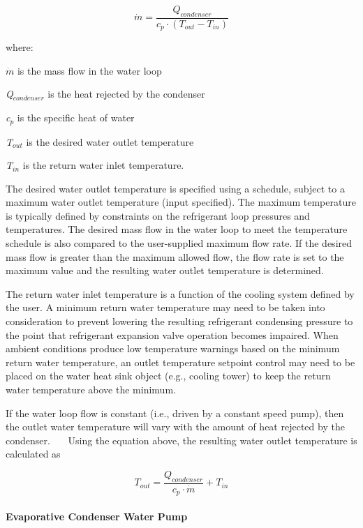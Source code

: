 \begin{equation}
\dot{m} = \frac{{{Q_{condenser}}}}{{{c_p} \cdot ({T_{out}} - {T_{in}})}}
\end{equation}

where:

\emph{\(\dot{m}\)} is the mass flow in the water loop

\emph{Q\(_{condenser}\)} is the heat rejected by the condenser

\emph{c\(_{p}\)} is the specific heat of water

\emph{T\(_{out}\)} is the desired water outlet temperature

\emph{T\(_{in}\)} is the return water inlet temperature.

The desired water outlet temperature is specified using a schedule, subject to a maximum water outlet temperature (input specified). The maximum temperature is typically defined by constraints on the refrigerant loop pressures and temperatures. The desired mass flow in the water loop to meet the temperature schedule is also compared to the user-supplied maximum flow rate. If the desired mass flow is greater than the maximum allowed flow, the flow rate is set to the maximum value and the resulting water outlet temperature is determined.

The return water inlet temperature is a function of the cooling system defined by the user. A minimum return water temperature may need to be taken into consideration to prevent lowering the resulting refrigerant condensing pressure to the point that refrigerant expansion valve operation becomes impaired. When ambient conditions produce low temperature warnings based on the minimum return water temperature, an outlet temperature setpoint control may need to be placed on the water heat sink object (e.g., cooling tower) to keep the return water temperature above the minimum.

If the water loop flow is constant (i.e., driven by a constant speed pump), then the outlet water temperature will vary with the amount of heat rejected by the condenser.~~~ Using the equation above, the resulting water outlet temperature is calculated as

\begin{equation}
{T_{out}} = \frac{{{Q_{condenser}}}}{{{c_p} \cdot \dot{m}}} + {T_{in}}
\end{equation}

\paragraph{Evaporative Condenser Water Pump}\label{evaporative-condenser-water-pump}

